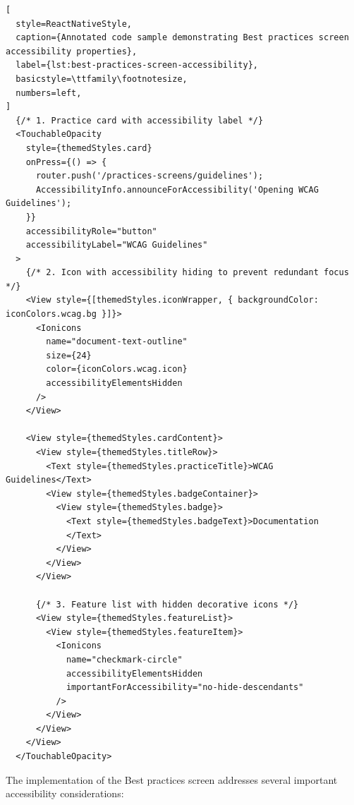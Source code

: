 \begin{lstlisting}[
  style=ReactNativeStyle,
  caption={Annotated code sample demonstrating Best practices screen accessibility properties},
  label={lst:best-practices-screen-accessibility},
  basicstyle=\ttfamily\footnotesize,
  numbers=left,
]
  {/* 1. Practice card with accessibility label */}
  <TouchableOpacity
    style={themedStyles.card}
    onPress={() => {
      router.push('/practices-screens/guidelines');
      AccessibilityInfo.announceForAccessibility('Opening WCAG Guidelines');
    }}
    accessibilityRole="button"
    accessibilityLabel="WCAG Guidelines"
  >
    {/* 2. Icon with accessibility hiding to prevent redundant focus */}
    <View style={[themedStyles.iconWrapper, { backgroundColor: iconColors.wcag.bg }]}>
      <Ionicons
        name="document-text-outline"
        size={24}
        color={iconColors.wcag.icon}
        accessibilityElementsHidden
      />
    </View>

    <View style={themedStyles.cardContent}>
      <View style={themedStyles.titleRow}>
        <Text style={themedStyles.practiceTitle}>WCAG Guidelines</Text>
        <View style={themedStyles.badgeContainer}>
          <View style={themedStyles.badge}>
            <Text style={themedStyles.badgeText}>Documentation
            </Text>
          </View>
        </View>
      </View>

      {/* 3. Feature list with hidden decorative icons */}
      <View style={themedStyles.featureList}>
        <View style={themedStyles.featureItem}>
          <Ionicons
            name="checkmark-circle"
            accessibilityElementsHidden
            importantForAccessibility="no-hide-descendants"
          />
        </View>
      </View>
    </View>
  </TouchableOpacity>
\end{lstlisting}

The implementation of the Best practices screen addresses several important accessibility considerations:

